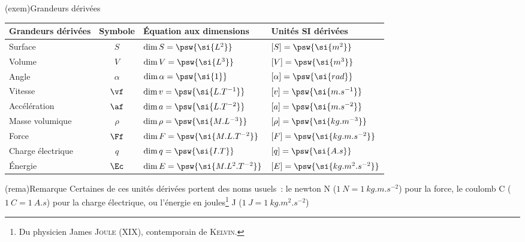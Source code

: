 \documentclass[../main/main.tex]{subfiles}
\begin{document}
\begin{tcb}[label=exem:grandeurs](exem){Grandeurs dérivées}
	\begin{center}
		\begin{tabular}{lcll}
			\toprule
			Grandeurs dérivées & Symbole  & Équation aux dimensions                  & Unités SI dérivées                      \\
			\midrule
			Surface            & $S$      & $\dim{S}      = \psw{\si{L^2}}$          & $ [S]      = \psw{\si{m^2}}           $      \\
			Volume             & $V$      & $\dim{V}      = \psw{\si{L^3}}$          & $ [V]      = \psw{\si{m^3}}           $      \\
			Angle              & $\alpha$ & $\dim{\alpha} = \psw{\si{1}}$            & $ [\alpha] = \psw{\si{rad}}           $ \\
			Vitesse            & $\vf$    & $\dim{v}      = \psw{\si{L.T^{-1}}}$     & $ [v]      = \psw{\si{m.s^{-1}}}      $      \\
			Accélération       & $\af$    & $\dim{a}      = \psw{\si{L.T^{-2}}}$     & $ [a]      = \psw{\si{m.s^{-2}}}      $      \\
			Masse volumique    & $\rho$   & $\dim{\rho}   = \psw{\si{M.L^{-3}}}$     & $ [\rho]   = \psw{\si{kg.m^{-3}}}     $   \\
			Force              & $\Ff$    & $\dim{F}      = \psw{\si{M.L.T^{-2}}}$  & $ [F]      = \psw{\si{kg.m.s^{-2}}}   $      \\
			Charge électrique  & $q$      & $\dim{q}      = \psw{\si{I.T}}$          & $ [q]      = \psw{\si{A.s}}           $      \\
			Énergie            & $\Ec$    & $\dim{E}      = \psw{\si{M.L^2.T^{-2}}}$ & $ [E]      = \psw{\si{kg.m^2.s^{-2}}} $      \\
			\bottomrule
		\end{tabular}
	\end{center}
\end{tcb}
\begin{tcb}(rema){Remarque}
	Certaines de ces unités dérivées portent des noms usuels~: le newton N
	($\SI{1}{N} = \SI{1}{kg.m.s^{-2}}$) pour la force, le coulomb C ($\SI{1}{C} =
	\SI{1}{A.s}$) pour la charge électrique, ou l'énergie en joules\footnote{Du
		physicien James \textsc{Joule} (\textsc{XIX}\ieme), contemporain de
		\textsc{Kelvin}.} J ($\SI{1}{J} = \SI{1}{kg.m^2.s^{-2}}$)
\end{tcb}
\end{document}
